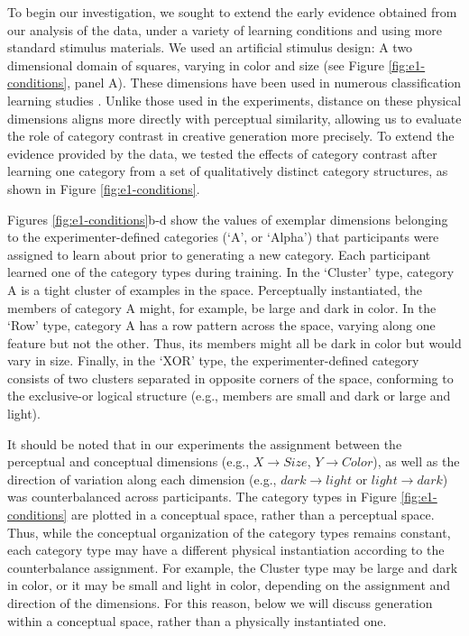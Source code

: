 \documentclass[12pt]{article}
\begin{document}
\begin{flushleft}
To begin our investigation, we sought to extend the early evidence obtained from
our analysis of the \cite{jern2013probabilistic} data, under a variety of
learning conditions and using more standard stimulus materials. We used an
artificial stimulus design: A two dimensional domain of squares, varying in
color and size (see Figure \ref{fig:e1-conditions}, panel A). These dimensions
have been used in numerous classification learning studies
\cite[e.g.,][]{conaway2016similar,conaway2016generalization,shepard1961learning,nosofsky1994comparing}.
Unlike those used in the \cite{jern2013probabilistic} experiments, distance on
these physical dimensions aligns more directly with perceptual similarity,
allowing us to evaluate the role of category contrast in creative generation
more precisely. To extend the evidence provided by the
\cite{jern2013probabilistic} data, we tested the effects of category contrast
after learning one category from a set of qualitatively distinct category
structures, as shown in Figure \ref{fig:e1-conditions}.

Figures \ref{fig:e1-conditions}b-d show the values of exemplar dimensions
belonging to the experimenter-defined categories (`A', or `Alpha') that
participants were assigned to learn about prior to generating a new category.
Each participant learned one of the category types during training. In the
`Cluster' type, category A is a tight cluster of examples in the space.
Perceptually instantiated, the members of category A might, for example, be
large and dark in color. In the `Row' type, category A has a row pattern across
the space, varying along one feature but not the other. Thus, its members might
all be dark in color but would vary in size. Finally, in the `XOR' type, the
experimenter-defined category consists of two clusters separated in opposite
corners of the space, conforming to the exclusive-or logical structure (e.g.,
members are small and dark or large and light).

It should be noted that in our experiments the assignment between the perceptual
and conceptual dimensions (e.g., $X \rightarrow Size$, $Y \rightarrow Color$),
as well as the direction of variation along each dimension (e.g., $dark
\rightarrow light$ or $light \rightarrow dark$) was counterbalanced across
participants. The category types in Figure \ref{fig:e1-conditions} are plotted
in a conceptual space, rather than a perceptual space. Thus, while the
conceptual organization of the category types remains constant, each category
type may have a different physical instantiation according to the counterbalance
assignment. For example, the Cluster type may be large and dark in color, or it
may be small and light in color, depending on the assignment and direction of
the dimensions. For this reason, below we will discuss generation within a
conceptual space, rather than a physically instantiated one.


\end{flushleft}
\end{document}
